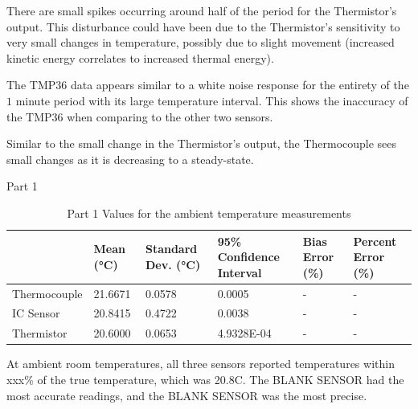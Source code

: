 \documentclass{article}
\begin{document}
    
    There are small spikes occurring around half of the period for the Thermistor's output. This disturbance could have been due to the Thermistor's sensitivity to very small changes in temperature, possibly due to slight movement (increased kinetic energy correlates to increased thermal energy).
    
    The TMP36 data appears similar to a white noise response for the entirety of the $1$ minute period with its large temperature interval. This shows the inaccuracy of the TMP36 when comparing to the other two sensors.
    
    Similar to the small change in the Thermistor's output, the Thermocouple sees small changes as it is decreasing to a steady-state. 


Part 1 %

\begin{table}
    \centering
    \begin{tabularx}{\textwidth}{|X|X|X|X|X|X|}
        \hline
        & Mean (°C) & Standard Dev. (°C) & 95\% Confidence Interval & Bias Error (\%) & Percent Error (\%) \\
        \hline
        Thermocouple & 21.6671 & 0.0578 & 0.0005 & - & - \\
        \hline
        IC Sensor & 20.8415 & 0.4722 & 0.0038 & - & -\\
        \hline
        Thermistor & 20.6000 & 0.0653 & 4.9328E-04 & - & - \\
        \hline
    \end{tabularx}
    \caption{Part 1 Values for the ambient temperature measurements}
    \label{tab:Ambient_temp_stats}
\end{table}

At ambient room temperatures, all three sensors reported temperatures within xxx\% of the true temperature, which was 20.8\degree C.  The BLANK SENSOR had the most accurate readings, and the BLANK SENSOR was the most precise.  
\end{document}
